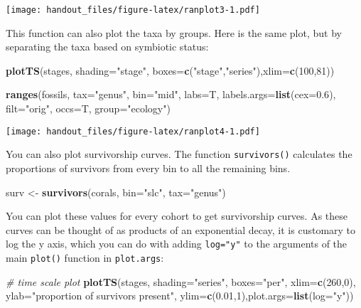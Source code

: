 \documentclass[]{article}
\newenvironment{Shaded}{\begin{snugshade}}{\end{snugshade}}
\newcommand{\CommentTok}[1]{\textcolor[rgb]{0.56,0.35,0.01}{\textit{#1}}}
\newcommand{\DataTypeTok}[1]{\textcolor[rgb]{0.13,0.29,0.53}{#1}}
\newcommand{\DecValTok}[1]{\textcolor[rgb]{0.00,0.00,0.81}{#1}}
\newcommand{\FloatTok}[1]{\textcolor[rgb]{0.00,0.00,0.81}{#1}}
\newcommand{\KeywordTok}[1]{\textcolor[rgb]{0.13,0.29,0.53}{\textbf{#1}}}
\newcommand{\NormalTok}[1]{#1}
\newcommand{\StringTok}[1]{\textcolor[rgb]{0.31,0.60,0.02}{#1}}
\begin{document}
\texttt{[image: handout\_files/figure-latex/ranplot3-1.pdf]}

This function can also plot the taxa by groups. Here is the same plot,
but by separating the taxa based on symbiotic status:

\begin{Shaded}
\begin{Highlighting}[]
\KeywordTok{plotTS}\NormalTok{(stages, }\DataTypeTok{shading=}\StringTok{"stage"}\NormalTok{, }\DataTypeTok{boxes=}\KeywordTok{c}\NormalTok{(}\StringTok{"stage"}\NormalTok{,}\StringTok{"series"}\NormalTok{),}\DataTypeTok{xlim=}\KeywordTok{c}\NormalTok{(}\DecValTok{100}\NormalTok{,}\DecValTok{81}\NormalTok{))}

\KeywordTok{ranges}\NormalTok{(fossils, }\DataTypeTok{tax=}\StringTok{"genus"}\NormalTok{, }\DataTypeTok{bin=}\StringTok{"mid"}\NormalTok{, }\DataTypeTok{labs=}\NormalTok{T, }
  \DataTypeTok{labels.args=}\KeywordTok{list}\NormalTok{(}\DataTypeTok{cex=}\FloatTok{0.6}\NormalTok{), }\DataTypeTok{filt=}\StringTok{"orig"}\NormalTok{, }\DataTypeTok{occs=}\NormalTok{T, }\DataTypeTok{group=}\StringTok{"ecology"}\NormalTok{)}
\end{Highlighting}
\end{Shaded}

\texttt{[image: handout\_files/figure-latex/ranplot4-1.pdf]}

You can also plot survivorship curves. The function \texttt{survivors()}
calculates the proportions of survivors from every bin to all the
remaining bins.

\begin{Shaded}
\begin{Highlighting}[]
\NormalTok{surv <-}\StringTok{ }\KeywordTok{survivors}\NormalTok{(corals, }\DataTypeTok{bin=}\StringTok{"slc"}\NormalTok{, }\DataTypeTok{tax=}\StringTok{"genus"}\NormalTok{)}
\end{Highlighting}
\end{Shaded}

You can plot these values for every cohort to get survivorship curves.
As these curves can be thought of as products of an exponential decay,
it is customary to log the y axis, which you can do with adding
\texttt{log="y"} to the arguments of the main \texttt{plot()} function
in \texttt{plot.args}:

\begin{Shaded}
\begin{Highlighting}[]
\CommentTok{# time scale plot}
\KeywordTok{plotTS}\NormalTok{(stages, }\DataTypeTok{shading=}\StringTok{"series"}\NormalTok{, }\DataTypeTok{boxes=}\StringTok{"per"}\NormalTok{, }
  \DataTypeTok{xlim=}\KeywordTok{c}\NormalTok{(}\DecValTok{260}\NormalTok{,}\DecValTok{0}\NormalTok{), }\DataTypeTok{ylab=}\StringTok{"proportion of survivors present"}\NormalTok{,}
  \DataTypeTok{ylim=}\KeywordTok{c}\NormalTok{(}\FloatTok{0.01}\NormalTok{,}\DecValTok{1}\NormalTok{),}\DataTypeTok{plot.args=}\KeywordTok{list}\NormalTok{(}\DataTypeTok{log=}\StringTok{"y"}\NormalTok{))}
\end{Highlighting}
\end{Shaded}
\end{document}
